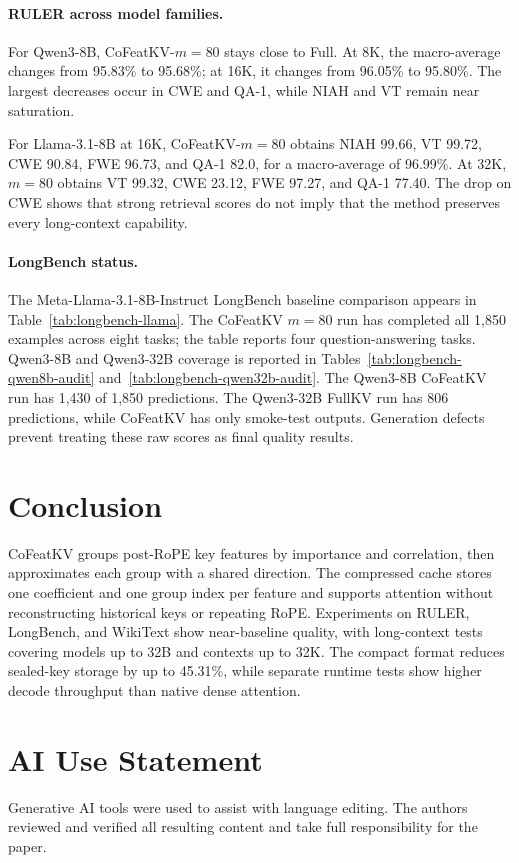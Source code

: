 \documentclass{article} %
\begin{document}
\paragraph{RULER across model families.}
For Qwen3-8B, CoFeatKV-$m=80$ stays close to Full. At 8K, the macro-average
changes from 95.83\% to 95.68\%; at 16K, it changes from 96.05\% to 95.80\%.
The largest decreases occur in CWE and QA-1, while NIAH and VT remain near
saturation.

For Llama-3.1-8B at 16K, CoFeatKV-$m=80$ obtains NIAH 99.66, VT 99.72, CWE
90.84, FWE 96.73, and QA-1 82.0, for a macro-average of 96.99\%. At 32K,
$m=80$ obtains VT 99.32, CWE 23.12, FWE 97.27, and QA-1 77.40.
The drop on CWE shows that strong retrieval scores do not imply that the
method preserves every long-context capability.

\paragraph{LongBench status.}
The Meta-Llama-3.1-8B-Instruct LongBench baseline comparison appears in
Table~\ref{tab:longbench-llama}. The CoFeatKV $m=80$ run has completed all
1,850 examples across eight tasks; the table reports four question-answering tasks.
Qwen3-8B and Qwen3-32B coverage is reported in
Tables~\ref{tab:longbench-qwen8b-audit} and~\ref{tab:longbench-qwen32b-audit}.
The Qwen3-8B CoFeatKV run has 1,430 of 1,850 predictions. The Qwen3-32B
FullKV run has 806 predictions, while CoFeatKV has only smoke-test outputs.
Generation defects prevent treating these raw scores as final quality results.
\fi

\section{Conclusion}

CoFeatKV groups post-RoPE key features by importance and correlation, then
approximates each group with a shared direction. The compressed cache stores
one coefficient and one group index per feature and supports attention without
reconstructing historical keys or repeating RoPE. Experiments on RULER,
LongBench, and WikiText show near-baseline quality, with long-context tests
covering models up to 32B and contexts up to 32K. The compact format reduces
sealed-key storage by up to 45.31\%, while separate runtime tests show higher
decode throughput than native dense attention.
\section*{AI Use Statement}
Generative AI tools were used to assist with language editing. The authors reviewed and verified
all resulting content and take full responsibility for the paper.
\end{document}
